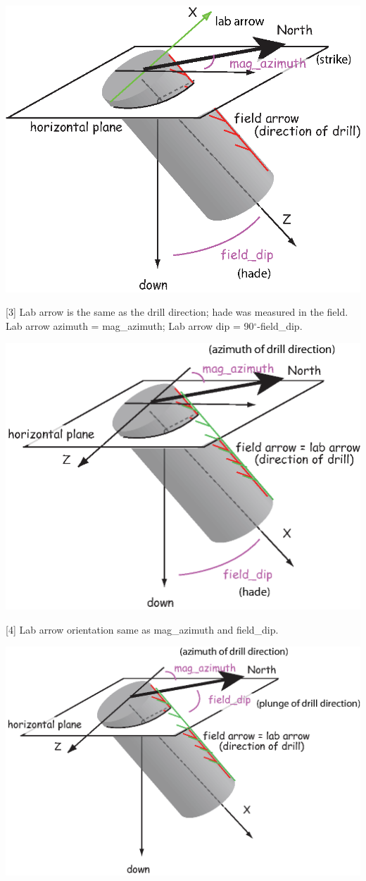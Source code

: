 \documentclass[11pt]{book}
\begin{document}
{{    \includegraphics[width=15cm]{EPSfiles/orcon_2.eps}

  [3] Lab arrow is the same as the drill direction; hade was measured in the field. Lab arrow azimuth = mag\_azimuth; Lab arrow dip = 90$^{\circ}$-field\_dip.

      \includegraphics[width=15cm]{EPSfiles/orcon_3.eps}

  [4] Lab arrow orientation same as mag\_azimuth and field\_dip.

        \includegraphics[width=15cm]{EPSfiles/orcon_4.eps}

}}
\end{document}
